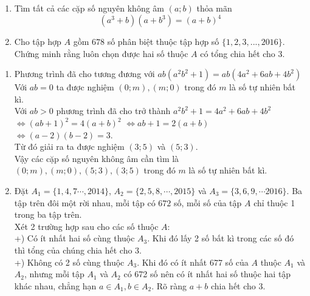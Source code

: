 \begin{ex}%
  \hfill
   \begin{enumerate}
        \item  Tìm tất cả các cặp số nguyên không âm $(a;b)$ thỏa mãn $$ (a^3+b)(a+b^3)=(a+b)^4$$
        \item Cho tập hợp $A$ gồm $678$ số phân biệt thuộc tập hợp số $\{1,2,3,...,2016\}$. Chứng minh rằng luôn chọn được hai số thuộc $A$ có tổng chia hết cho 3.
    \end{enumerate}
\loigiai
    {
    \begin{enumerate}
        \item  Phương trình đã cho tương đương với $ab(a^2b^2+1)=ab(4a^2+6ab+4b^2)$\\
        Với $ab=0$ ta được nghiệm $(0;m), (m;0)$ trong đó $m$ là số tự nhiên bất kì.\\
        Với $ab>0$ phương trình đã cho trở thành $a^2b^2+1=4a^2+6ab+4b^2$ $\Leftrightarrow (ab+1)^2=4(a+b)^2$ $\Leftrightarrow ab+1=2(a+b)$ $\Leftrightarrow (a-2)(b-2)=3$.\\
        Từ đó giải ra ta được nghiệm $(3;5)$ và $(5;3)$.\\
        Vậy các cặp số nguyên không âm cần tìm là $(0;m), (m;0), (5;3), (3;5)$ trong đó $m$ là số tự nhiên bất kì.
        \item Đặt $A_1=\{1,4,7\cdots ,2014\}$, $A_2=\{2,5,8, \cdots ,2015\}$ và $A_3=\{3,6,9, \cdots 2016\}$. Ba tập trên đôi một rời nhau, mỗi tập có $672$ số, mỗi số của tập $A$ chỉ thuộc 1 trong ba tập trên.\\
        Xét 2 trường hợp sau cho các số thuộc $A$:\\
        +) Có ít nhất hai số cùng thuộc $A_3$. Khi đó lấy 2 số bất kì trong các số đó thì tổng của chúng chia hết cho 3.\\
        +) Không có 2 số cùng thuộc $A_3$. Khi đó có ít nhất 677 số của $A$ thuộc $A_1$ và $A_2$, nhưng mỗi tập $A_1$ và $A_2$ có 672 số nên có ít nhất hai số thuộc hai tập khác nhau, chẳng hạn $a \in A_1, b \in A_2$. Rõ ràng $a+b$ chia hết cho 3.
    \end{enumerate}
    }
\end{ex}

